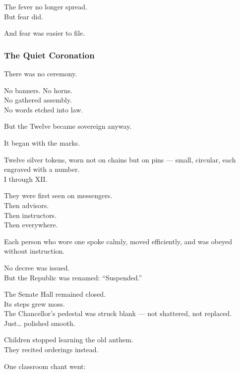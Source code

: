 \documentclass[12pt]{article}
\begin{document}
\vspace{1em}

The fever no longer spread.\\
But fear did.

And fear was easier to file.

\dotfill

\subsubsection{The Quiet Coronation}

There was no ceremony.

No banners. No horns.\\
No gathered assembly.\\
No words etched into law.

But the Twelve became sovereign anyway.

\vspace{1em}

It began with the marks.

Twelve silver tokens, worn not on chains but on pins — small, circular, each engraved with a number.\\
I through XII.

They were first seen on messengers.\\
Then advisors.\\
Then instructors.\\
Then everywhere.

Each person who wore one spoke calmly, moved efficiently, and was obeyed without instruction.

\vspace{1em}

No decree was issued.\\
But the Republic was renamed: “Suspended.”

The Senate Hall remained closed.\\
Its steps grew moss.\\
The Chancellor’s pedestal was struck blank — not shattered, not replaced.\\
Just… polished smooth.

\vspace{1em}

Children stopped learning the old anthem.\\
They recited orderings instead.

One classroom chant went:
\end{document}
